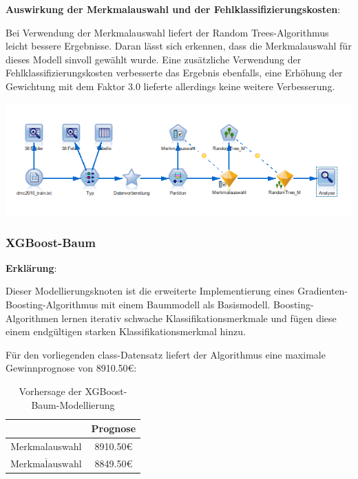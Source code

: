 \documentclass[a4paper,12pt]{article}
\newcounter{Algorithmus}
\begin{document}
{\bf Auswirkung der Merkmalauswahl und der Fehlklassifizierungskosten}:
\par
Bei Verwendung der Merkmalauswahl liefert der Random Trees-Algorithmus leicht bessere Ergebnisse.
Daran lässt sich erkennen, dass die Merkmalauswahl für dieses Modell sinvoll gewählt wurde.
Eine zusätzliche Verwendung der Fehlklassifizierungskosten verbesserte das Ergebnis ebenfalls, eine Erhöhung der Gewichtung mit dem Faktor 3.0 lieferte allerdings keine weitere Verbesserung.

\begin{center}
\includegraphics[width=\textwidth]{Screens/random_trees_m}
\end{center}

\subsubsection{XGBoost-Baum}
{\bf Erklärung}:
\par
\vspace{0.2cm}
Dieser Modellierungsknoten ist die erweiterte Implementierung eines Gradienten-Boosting-Algorithmus mit einem
Baummodell als Basismodell. Boosting-Algorithmen lernen iterativ schwache Klassifikationsmerkmale
und fügen diese einem endgültigen starken Klassifikationsmerkmal hinzu.
\par
\vspace{0.2cm}
Für den vorliegenden class-Datensatz liefert der Algorithmus eine maximale Gewinnprognose von 8910.50\;\euro\;:
\begin{table}[h]
\begin{center}
	\begin{tabular}{c | c}
	 & Prognose
	\\
	\hline
	Merkmalauswahl & 8910.50\;\euro
	\\
	$\overline{\text{Merkmalauswahl}}$ & 8849.50\;\euro
	\end{tabular}
\end{center}
\caption{Vorhersage der XGBoost-Baum-Modellierung}
\end{table}
\end{document}
